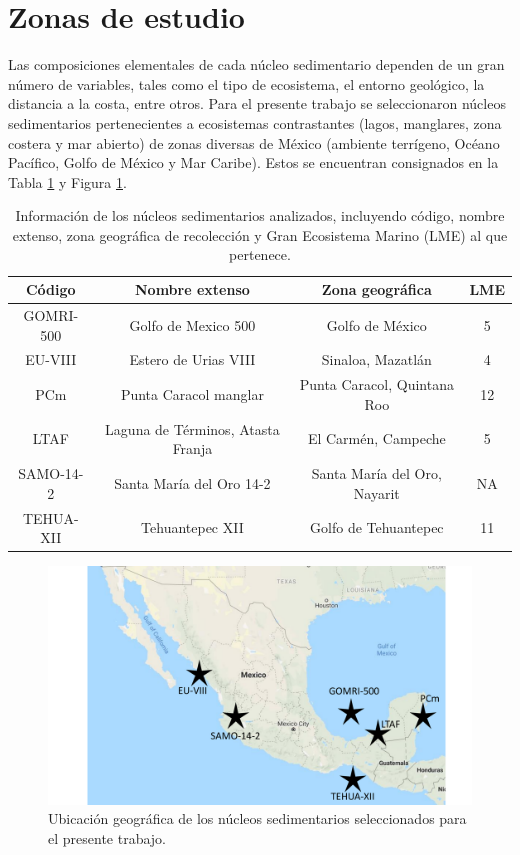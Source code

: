 	\section{Zonas de estudio}\label{Secc-ZonasSeleccionadas}
Las composiciones elementales de cada núcleo sedimentario dependen de un gran número de variables, tales como el tipo de ecosistema, el entorno geológico, la distancia a la costa, entre otros. Para el presente trabajo se seleccionaron núcleos sedimentarios pertenecientes a ecosistemas contrastantes (lagos, manglares, zona costera y mar abierto) de zonas diversas de México (ambiente terrígeno, Océano Pacífico, Golfo de México y Mar Caribe). Estos se encuentran consignados en la Tabla \ref{Table-ZonasSeleccionadas} y Figura \ref{Fig-Mapa}. 
\begin{table}[h]
\centering
\caption{Información de los núcleos sedimentarios analizados, incluyendo código, nombre extenso, zona geográfica de recolección y Gran Ecosistema Marino (LME) al que pertenece.}\label{Table-ZonasSeleccionadas}
\begin{tabular}{|c|c|c|c|}
	\hline								
\rowcolor{Blue2}	Código 	&	Nombre extenso	&	Zona geográfica	& 	LME	 \\	\hline
\rowcolor{Blue1}	GOMRI-500	&	Golfo de Mexico 500	&	Golfo de México	&	5	 \\	
\rowcolor{Blue1}	EU-VIII	&	Estero de Urias VIII	&	Sinaloa, Mazatlán	&	4	 \\	
\rowcolor{Blue1}	PCm	&	Punta Caracol manglar	&	Punta Caracol, Quintana Roo	&	12	 \\	
\rowcolor{Blue1}	LTAF	&	Laguna de Términos, Atasta Franja	&	El Carmén, Campeche	&	5	 \\	
\rowcolor{Blue1}	SAMO-14-2	&	Santa María del Oro 14-2	&	Santa María del Oro, Nayarit	&	NA 	 \\	
\rowcolor{Blue1}	TEHUA-XII	&	Tehuantepec  XII	&	Golfo de Tehuantepec	&	11	 \\	\hline
\end{tabular}
\end{table}
\begin{figure}[h]
\centering
\includegraphics[width=\textwidth]{Imagenes/Mapa_Nucleos_Seleccionados.pdf}
\caption{Ubicación geográfica de los núcleos sedimentarios seleccionados para el presente trabajo.}\label{Fig-Mapa}
\end{figure}
